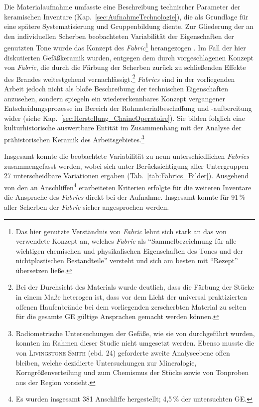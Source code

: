 Die Materialaufnahme umfasste eine Beschreibung technischer Parameter der keramischen Inventare (Kap.~\ref{sec:AufnahmeTechnologie}), die als Grundlage für eine spätere Systematisierung und Gruppenbildung diente. Zur Gliederung der an den individuellen Scherben beobachteten Variabilität der Eigenschaften der genutzten Tone wurde das Konzept des \textit{Fabric}\footnote{Das hier genutzte Verständnis von \textit{Fabric} lehnt sich stark an das von \textcite[49]{Lange.2006} verwendete Konzept an, welches \textit{Fabric} als \enquote{Sammelbezeichnung für alle wichtigen chemischen und physikalischen Eigenschaften des Tones und der nichtplastischen Bestandteile} versteht und sich am besten mit \enquote{Rezept} übersetzen ließe.} herangezogen \parencite[ebd. 49, 54--56][38--51]{Riemer.2011}. Im Fall der hier diskutierten Gefäßkeramik wurden, entgegen dem durch \textcite[34]{Nordstrom.1972} vorgeschlagenen Konzept von \textit{Fabric}, die durch die Färbung der Scherben zurück zu schließenden Effekte des Brandes weitestgehend vernachlässigt.\footnote{Bei der Durchsicht des Materials wurde deutlich, dass die Färbung der Stücke in einem Maße heterogen ist, dass vor dem Licht der universal praktizierten offenen Haufenbrände bei dem vorliegenden zerscherbten Material zu selten für die gesamte GE gültige Ansprachen gemacht werden können.} \textit{Fabrics} sind in der vorliegenden Arbeit jedoch nicht als bloße Beschreibung der technischen Eigenschaften anzusehen, sondern spiegeln ein wiedererkennbares Konzept vergangener Entscheidungsprozesse im Bereich der Rohmaterialbeschaffung und -aufbereitung wider (siehe Kap.~\ref{sec:Herstellung_ChaineOperatoire}). Sie bilden folglich eine kulturhistorische auswertbare Entität im Zusammenhang mit der Analyse der prähistorischen Keramik des Arbeitsgebietes.\footnote{Radiometrische Untersuchungen der Gefäße, wie sie von \textcite{LivingstoneSmith.2007d} durchgeführt wurden, konnten im Rahmen dieser Studie nicht umgesetzt werden. Ebenso musste die von \textsc{Livingstone Smith} (ebd. 24) geforderte zweite Analyseebene offen bleiben, welche dezidierte Untersuchungen zur Mineralogie, Korngrößenverteilung und zum Chemismus der Stücke sowie von Tonproben aus der Region vorsieht.}

Insgesamt konnte die beobachtete Variabilität zu neun unterschiedlichen \textit{Fabrics} zusammengefasst werden, wobei sich unter Berücksichtigung aller Untergruppen 27 unterscheidbare Variationen ergaben (Tab.~\ref{tab:Fabrics_Bilder}). Ausgehend von den an Anschliffen\footnote{Es wurden insgesamt 381 Anschliffe hergestellt; 4,5\,\% der untersuchten GE.} erarbeiteten Kriterien erfolgte für die weiteren Inventare die Ansprache des \textit{Fabrics} direkt bei der Aufnahme. Insgesamt konnte für 91\,\% aller Scherben der \textit{Fabric} sicher angesprochen werden. 

